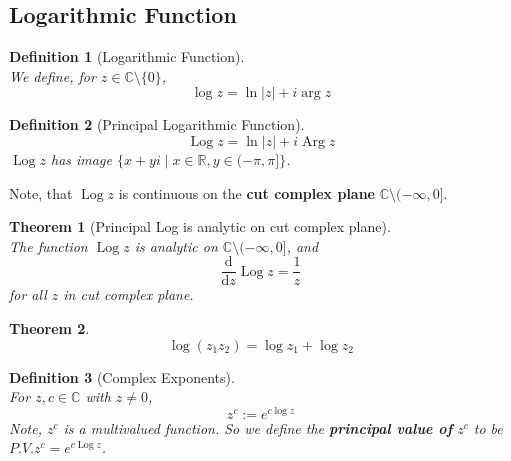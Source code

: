 \documentclass[12pt]{article}
\newcommand{\diff}{\mathrm{d}}
\newtheorem{definition}{Definition}[section]
\newtheorem{theorem}{Theorem}[section]
\theoremstyle{definition}
\DeclareMathOperator{\Log}{Log}
\DeclareMathOperator{\Arg}{Arg}
\begin{document}
\subsection{Logarithmic Function}
\begin{definition}[Logarithmic Function]
\hfill\\\normalfont We define, for $z\in\mathbb{C}\setminus\{0\}$,
\[
\log z = \ln |z| + i\arg z
\]
\end{definition}
\begin{definition}[Principal Logarithmic Function]
\hfill\\\normalfont 
\[
\Log z = \ln |z| + i\Arg z
\]
$\Log z$ has image $\{x+yi\mid x\in\mathbb{R}, y\in (-\pi, \pi]\}$.
\end{definition}
Note, that $\Log z$ is continuous on the \textbf{cut complex plane} $\mathbb{C}\setminus(-\infty, 0]$.
\begin{theorem}[Principal Log is analytic on cut complex plane]
\hfill\\\normalfont
The function $\Log z$ is analytic on $\mathbb{C}\setminus(-\infty, 0]$, and
\[
\frac{\diff}{\diff z}\Log z = \frac{1}{z}
\]
for all $z$ in cut complex plane.
\end{theorem}
\begin{theorem}\[\log(z_1z_2) = \log z_1 + \log z_2\]\end{theorem}
\begin{definition}[Complex Exponents]
\hfill\\\normalfont For $z,c\in \mathbb{C}$ with $z\neq 0$, 
\[
z^c:=e^{c\log z}
\]
Note, $z^c$ is a multivalued function. So we define the \textbf{principal value of }$z^c$ to be $P.V. z^c=e^{c\Log z}$.
\end{definition}
\end{document}
